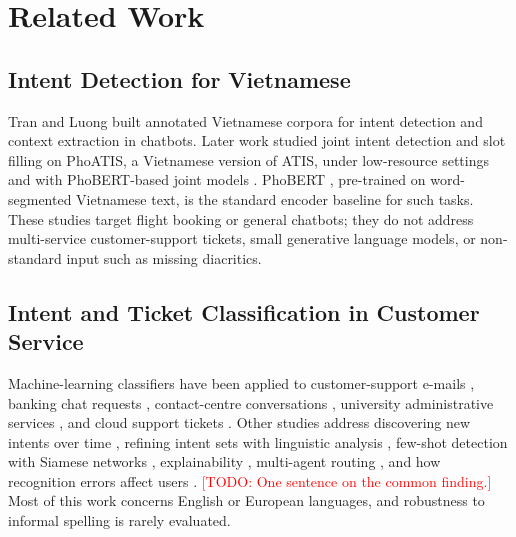 \documentclass[conference]{IEEEtran}
\newcommand{\TODO}[1]{\textcolor{red}{[TODO: #1]}}
\begin{document}
\section{Related Work}
\label{sec:related}

\subsection{Intent Detection for Vietnamese}
Tran and Luong \cite{tran2020understanding} built annotated Vietnamese
corpora for intent detection and context extraction in chatbots. Later work
studied joint intent detection and slot filling on PhoATIS, a Vietnamese
version of ATIS, under low-resource settings \cite{nguyen2022intent} and
with PhoBERT-based joint models \cite{nguyen2022advanced}. PhoBERT
\cite{nguyen2020phobert}, pre-trained on word-segmented Vietnamese text, is
the standard encoder baseline for such tasks. These studies target flight
booking or general chatbots; they do not address multi-service
customer-support tickets, small generative language models, or
non-standard input such as missing diacritics.

\subsection{Intent and Ticket Classification in Customer Service}
Machine-learning classifiers have been applied to customer-support
e-mails \cite{borg2021email}, banking chat requests
\cite{bonechi2024enhancing}, contact-centre conversations
\cite{pawlik2022method}, university administrative services
\cite{rizou2023efficient}, and cloud support tickets
\cite{nowakbrzezinska2025hybrid}. Other studies address discovering new
intents over time \cite{rebelo2022automatic}, refining intent sets with
linguistic analysis \cite{ferrera2025linguistics}, few-shot detection with
Siamese networks \cite{muhammad2025similarity}, explainability
\cite{licina2026helpagent}, multi-agent routing \cite{arslan2026application},
and how recognition errors affect users \cite{martijn2026answered}.
\TODO{One sentence on the common finding.} Most of this work concerns
English or European languages, and robustness to informal spelling is
rarely evaluated.
\end{document}
